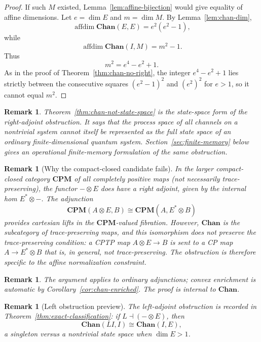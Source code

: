 \documentclass[11pt]{article}
\newtheorem{remark}[theorem]{Remark}
\DeclareMathOperator{\affdim}{affdim}
\begin{document}
\begin{proof}
If such $M$ existed, Lemma~\ref{lem:affine-bijection} would give equality of
affine dimensions. Let $e=\dim E$ and $m=\dim M$. By
Lemma~\ref{lem:chan-dim},
\[
\affdim\mathbf{Chan}(E,E)=e^2(e^2-1),
\]
while
\[
\affdim\mathbf{Chan}(I,M)=m^2-1.
\]
Thus
\[
m^2=e^4-e^2+1.
\]
As in the proof of Theorem~\ref{thm:chan-no-right}, the integer $e^4-e^2+1$ lies
strictly between the consecutive squares $(e^2-1)^2$ and $(e^2)^2$ for $e>1$, so
it cannot equal $m^2$.
\end{proof}

\begin{remark}
Theorem~\ref{thm:chan-not-state-space} is the state-space form of the
right-adjoint obstruction. It says that the process space of all channels on
a nontrivial system cannot itself be represented as the full state space of an
ordinary finite-dimensional quantum system. Section~\ref{sec:finite-memory}
below gives an operational finite-memory formulation of the same obstruction.
\end{remark}

\begin{remark}[Why the compact-closed candidate fails]
\label{rem:cpm-vs-chan}
In the larger compact-closed category $\mathbf{CPM}$ of all completely
positive maps (not necessarily trace-preserving), the functor $-\otimes E$
does have a right adjoint, given by the internal hom $E^*\otimes -$. The
adjunction
\[
\mathbf{CPM}(A\otimes E,B)\cong\mathbf{CPM}(A,E^*\otimes B)
\]
provides cartesian lifts in the $\mathbf{CPM}$-valued fibration. However,
$\mathbf{Chan}$ is the subcategory of trace-preserving maps, and this
isomorphism does not preserve the trace-preserving condition: a CPTP map
$A\otimes E\to B$ is sent to a CP map $A\to E^*\otimes B$ that is, in
general, not trace-preserving. The obstruction is therefore specific to the
affine normalization constraint.
\end{remark}

\begin{remark}
The argument applies to ordinary adjunctions; convex enrichment is automatic
by Corollary~\ref{cor:chan-enriched}. The proof is internal to
$\mathbf{Chan}$.
\end{remark}

\begin{remark}[Left obstruction preview]
\label{rem:chan-left-preview}
The left-adjoint obstruction is recorded in
Theorem~\ref{thm:exact-classification}: if
$L\dashv(-\otimes E)$, then
\[
\mathbf{Chan}(LI,I)\cong\mathbf{Chan}(I,E),
\]
a singleton versus a nontrivial state space when $\dim E>1$.
\end{remark}
\end{document}
